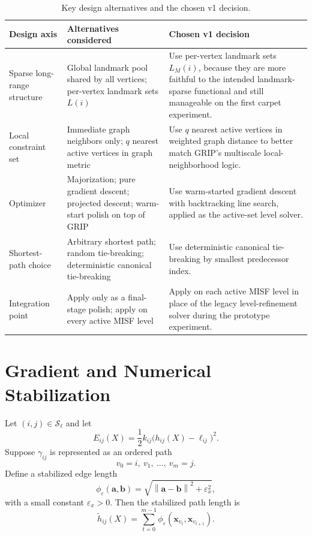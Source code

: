 \documentclass[11pt]{article}
\newcommand{\norm}[1]{\left\lVert #1 \right\rVert}
\newcommand{\vect}[1]{\mathbf{#1}}
\begin{document}
\begin{table}[h]
\centering
\caption{Key design alternatives and the chosen v1 decision.}
\label{tab:v1-choices}
\begin{tabular}{@{}>{\raggedright\arraybackslash}p{}>{\raggedright\arraybackslash}p{}>{\raggedright\arraybackslash}p{}@{}}
\toprule
Design axis & Alternatives considered & Chosen v1 decision \\
\midrule
Sparse long-range structure &
Global landmark pool shared by all vertices; per-vertex landmark sets $L(i)$ &
Use per-vertex landmark sets $L_M(i)$, because they are more faithful to the intended landmark-sparse functional and still manageable on the first carpet experiment. \\
\addlinespace
Local constraint set &
Immediate graph neighbors only; $q$ nearest active vertices in graph metric &
Use $q$ nearest active vertices in weighted graph distance to better match GRIP's multiscale local-neighborhood logic. \\
\addlinespace
Optimizer &
Majorization; pure gradient descent; projected descent; warm-start polish on top of GRIP &
Use warm-started gradient descent with backtracking line search, applied as the active-set level solver. \\
\addlinespace
Shortest-path choice &
Arbitrary shortest path; random tie-breaking; deterministic canonical tie-breaking &
Use deterministic canonical tie-breaking by smallest predecessor index. \\
\addlinespace
Integration point &
Apply only as a final-stage polish; apply on every active MISF level &
Apply on each active MISF level in place of the legacy level-refinement solver during the prototype experiment. \\
\bottomrule
\end{tabular}
\end{table}

\section{Gradient and Numerical Stabilization}

Let $(i,j)\in\mathcal{S}_\ell$ and let
\[
E_{ij}(X)=\frac{1}{2}k_{ij}\bigl(h_{ij}(X)-\ell_{ij}\bigr)^2.
\]
Suppose $\gamma_{ij}$ is represented as an ordered path
\[
v_0=i,\ v_1,\ \dots,\ v_m=j.
\]
Define a stabilized edge length
\[
\phi_\varepsilon(\vect{a},\vect{b})
=
\sqrt{\norm{\vect{a}-\vect{b}}^2 + \varepsilon_x^2},
\]
with a small constant $\varepsilon_x > 0$.
Then the stabilized path length is
\[
\tilde{h}_{ij}(X)
=
\sum_{t=0}^{m-1}\phi_\varepsilon(\vect{x}_{v_t},\vect{x}_{v_{t+1}}).
\]
\end{document}
